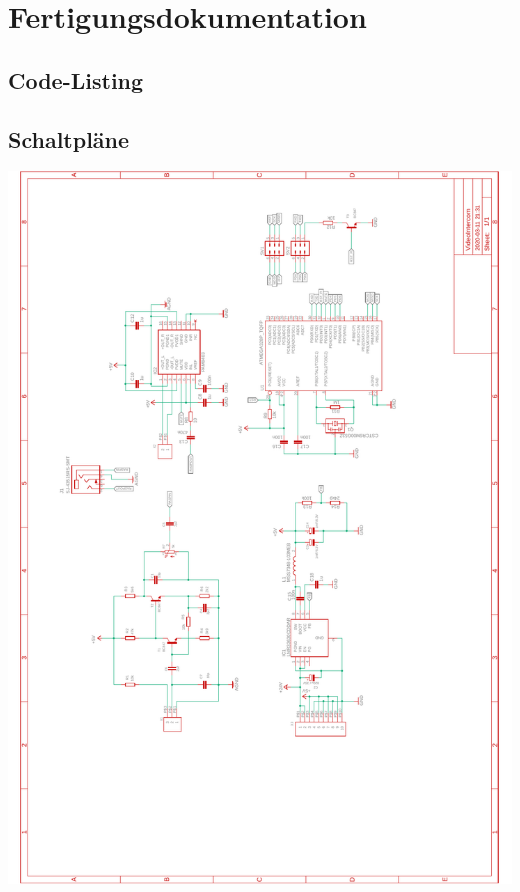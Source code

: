 \documentclass[a4paper, twoside, 12pt, openright]{memoir}
\begin{document}
\chapter{Fertigungsdokumentation}
\section{Code-Listing}

\section{Schaltpläne}
\includegraphics[width=15.5cm]{images/appendix/schematics.pdf}
\end{document}
